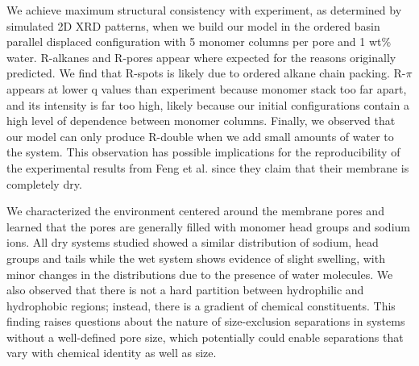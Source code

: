 \documentclass[journal=jpcbfk,manuscript=article]{achemso}
\begin{document}
  We achieve maximum structural consistency with experiment, as determined by
  simulated 2D XRD patterns, when we build our model in the ordered basin
  parallel displaced configuration with 5 monomer columns per pore and 1 wt\%
  water. R-alkanes and R-pores appear where expected for the reasons originally
  predicted. We find that R-spots is likely due to ordered alkane chain packing.
  R-$\pi$ appears at lower q values than experiment because monomer stack too far
  apart, and its intensity is far too high, likely because our initial
  configurations contain a high level of dependence between monomer columns.
  Finally, we observed that our model can only produce R-double when we add 
  small amounts of water to the system. This observation has possible implications
  for the reproducibility of the experimental results from Feng et al. since they
  claim that their membrane is completely dry. 

  

  We characterized the environment centered around the membrane pores and
  learned that the pores are generally filled with monomer head groups and sodium
  ions. All dry systems studied showed a similar distribution of sodium, head
  groups and tails while the wet system shows evidence of slight swelling, with
  minor changes in the distributions due to the presence of water molecules. We
  also observed that there is not a hard partition between hydrophilic and
  hydrophobic regions; instead, there is a gradient of chemical constituents. This finding raises
  questions about the nature of size-exclusion separations in systems without a
  well-defined pore size, which potentially could enable separations that
  vary with chemical identity as well as size. 
\end{document}
